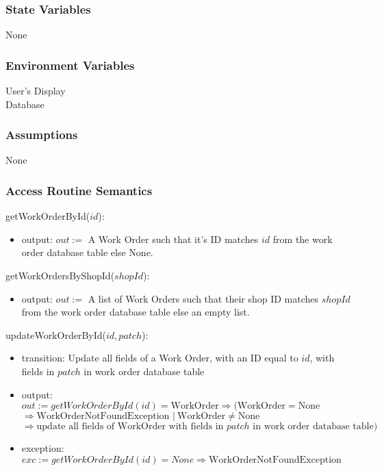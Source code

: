 \documentclass[12pt, titlepage]{article}
\begin{document}
\subsubsection{State Variables}

None

\subsubsection{Environment Variables}

User's Display \\ Database

\subsubsection{Assumptions}

None

\subsubsection{Access Routine Semantics}
\noindent getWorkOrderById($id$):
\begin{itemize}
	\item output: $out :=$ A Work Order such that it's ID matches $id$ from the work order database table
	      else None.
\end{itemize}

\noindent getWorkOrdersByShopId($shopId$):
\begin{itemize}
	\item output: $out :=$ A list of Work Orders such that their shop ID matches $shopId$ from the work order
	      database table else an empty list.
\end{itemize}

\noindent updateWorkOrderById($id, patch$):
\begin{itemize}
	\item transition: Update all fields of a Work Order, with an ID equal to $id$, with fields in $patch$ in
	      work order database table
	\item output: $out := getWorkOrderById(id) = \text{WorkOrder} \Rightarrow (\text{WorkOrder} = \text{None}
		      $ \\ $\Rightarrow \text{WorkOrderNotFoundException } |\ \text{WorkOrder} \neq \text{None}$ \\
		      $\Rightarrow \text{update all fields of WorkOrder with fields in } patch \text{ in work order
			      database table})$
	\item exception: $exc := getWorkOrderById(id) = None \Rightarrow \text{WorkOrderNotFoundException}$
\end{itemize}
\end{document}
